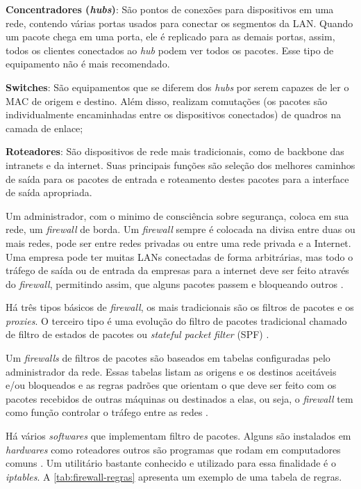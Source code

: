 \begin{alineas}
\item \textbf{Concentradores (\textit{hubs})}: São pontos de conexões para dispositivos em uma rede, contendo várias portas usados para conectar os segmentos da LAN. Quando um pacote chega em uma porta, ele é replicado para as demais portas, assim, todos os clientes conectados ao \textit{hub} podem ver todos os pacotes. Esse tipo de equipamento não é mais recomendado.
\item \textbf{Switches}: São equipamentos que se diferem dos \textit{hubs} por serem capazes de ler o MAC de origem e destino. Além disso, realizam comutações (os pacotes são individualmente encaminhadas entre os dispositivos conectados) de quadros na camada de enlace;
\item \textbf{Roteadores}: São dispositivos de rede mais tradicionais, como de backbone das intranets e da internet. Suas principais funções são seleção dos melhores caminhos de saída para os pacotes de entrada e roteamento destes pacotes para a interface de saída apropriada.
\end{alineas}

Um administrador, com o minimo de consciência sobre segurança, coloca em sua rede, um \textit{firewall} de borda. Um \textit{firewall} sempre é colocada na divisa entre duas ou mais redes, pode ser entre redes privadas ou entre uma rede privada e a Internet. Uma empresa pode ter muitas LANs conectadas de forma arbitrárias, mas todo o tráfego de saída ou de entrada da empresas para a internet deve ser feito através do \textit{firewall}, permitindo assim, que alguns pacotes passem e bloqueando outros \cite{redesdecomputadores}.

Há três tipos básicos de \textit{firewall}, os mais tradicionais são os filtros de pacotes e os \textit{proxies}. O terceiro tipo é uma evolução do filtro de pacotes tradicional chamado de filtro de estados de pacotes ou \textit{stateful packet filter} (SPF) \cite{univhacker}.

Um \textit{firewalls} de filtros de pacotes são baseados em tabelas configuradas pelo administrador da rede. Essas tabelas listam as origens e os destinos aceitáveis e/ou bloqueados e as regras padrões que orientam o que deve ser feito com os pacotes recebidos de outras máquinas ou destinados a elas, ou seja, o \textit{firewall} tem como função controlar o tráfego entre as redes \cite{redesdecomputadores}. 

Há vários \textit{softwares} que implementam filtro de pacotes. Alguns são instalados em \textit{hardwares} como roteadores outros são programas que rodam em computadores comuns \cite{univhacker}. Um utilitário bastante conhecido e utilizado para essa finalidade é o \textit{iptables}. A \autoref{tab:firewall-regras} apresenta um exemplo de uma tabela de regras.

